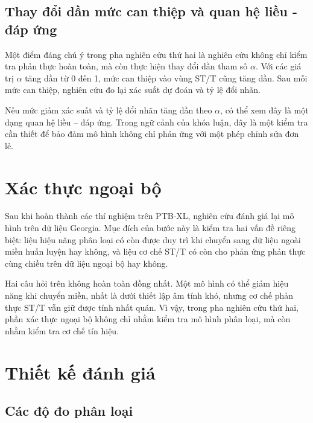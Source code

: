 \blocksep

\subsection{Thay đổi dần mức can thiệp và quan hệ liều - đáp ứng}

\blocksep

Một điểm đáng chú ý trong pha nghiên cứu thứ hai là nghiên cứu không chỉ kiểm tra phản thực hoàn toàn, mà còn thực hiện thay đổi dần tham số \(\alpha\). Với các giá trị $\alpha$ tăng dần từ 0 đến 1, mức can thiệp vào vùng ST/T cũng tăng dần. Sau mỗi mức can thiệp, nghiên cứu đo lại xác suất dự đoán và tỷ lệ đổi nhãn.

\blocksep

Nếu mức giảm xác suất và tỷ lệ đổi nhãn tăng dần theo $\alpha$, có thể xem đây là một dạng quan hệ liều -- đáp ứng. Trong ngữ cảnh của khóa luận, đây là một kiểm tra cần thiết để bảo đảm mô hình không chỉ phản ứng với một phép chỉnh sửa đơn lẻ.

\section{Xác thực ngoại bộ}

\blocksep

Sau khi hoàn thành các thí nghiệm trên PTB-XL, nghiên cứu đánh giá lại mô hình trên dữ liệu Georgia. Mục đích của bước này là kiểm tra hai vấn đề riêng biệt: liệu hiệu năng phân loại có còn được duy trì khi chuyển sang dữ liệu ngoài miền huấn luyện hay không, và liệu cơ chế ST/T có còn cho phản ứng phản thực cùng chiều trên dữ liệu ngoại bộ hay không.

\blocksep

Hai câu hỏi trên không hoàn toàn đồng nhất. Một mô hình có thể giảm hiệu năng khi chuyển miền, nhất là dưới thiết lập âm tính khó, nhưng cơ chế phản thực ST/T vẫn giữ được tính nhất quán. Vì vậy, trong pha nghiên cứu thứ hai, phần xác thực ngoại bộ không chỉ nhằm kiểm tra mô hình phân loại, mà còn nhằm kiểm tra cơ chế tín hiệu.

\section{Thiết kế đánh giá}

\blocksep

\subsection{Các độ đo phân loại}

